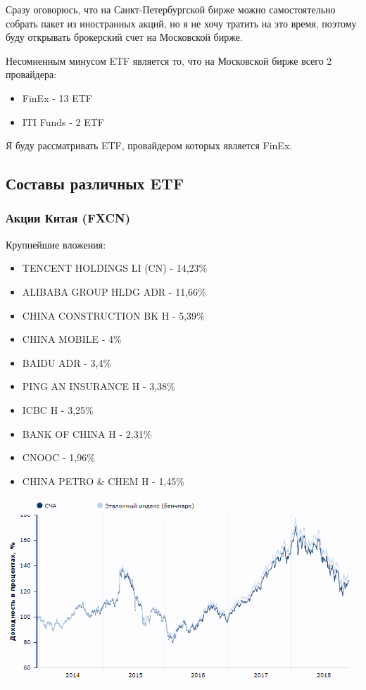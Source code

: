 Сразу оговорюсь, что на Санкт-Петербургской бирже можно самостоятельно собрать пакет из иностранных акций, но я не хочу тратить на это время, поэтому буду открывать брокерский счет на Московской бирже.

Несомненным минусом ETF является то, что на Московской бирже всего 2 провайдера:
\begin{itemize}
	\item FinEx - 13 ETF
	\item ITI Funds - 2 ETF
\end{itemize}

Я буду рассматривать ETF, провайдером которых является FinEx.

\subsection{Составы различных ETF}

\subsubsection{Акции Китая (FXCN)}

Крупнейшие вложения:

\begin{itemize}
	\item TENCENT HOLDINGS LI (CN) - 14,23\%
	\item ALIBABA GROUP HLDG ADR - 11,66\%
	\item CHINA CONSTRUCTION BK H - 5,39\%
	\item CHINA MOBILE - 4\%
	\item BAIDU ADR - 3,4\%
	\item PING AN INSURANCE H - 3,38\%
	\item ICBC H - 3,25\%
	\item BANK OF CHINA H - 2,31\%
	\item CNOOC - 1,96\%
	\item CHINA PETRO \& CHEM H - 1,45\%
\end{itemize}

\includegraphics[width=16cm]{pics/alina/china.png}

